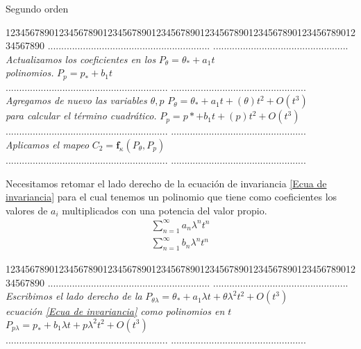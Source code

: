 \begin{center}
Segundo orden
\begin{tabbing}
12\=34567890123456789012345678901234567890123456\=7890123456789012345678901234567890\kill%
\>............................................................  \>..................................................\\
\> \textsl{Actualizamos los coeficientes en los} \> $P_{\theta}=\theta_{*}+a_{1}t$\\
\>\textsl{polinomios.} \> $P_{p}=p_{*}+b_{1}t$\\
\>............................................................  \>..................................................\\
\> \textsl{Agregamos de nuevo las variables $\theta,p$} \> $P_{\theta}=\theta_{*}+a_{1}t+(\theta)t^{2}+O(t^{3})$ \\
\> \textsl{para calcular el término cuadrático.} \> $P_{p}=p{*}+b_{1}t+(p)t^{2}+O(t^{3})$\\
\>............................................................  \>..................................................\\
\>\textsl{Aplicamos el mapeo} \> $C_{2}=\mathbf{f}_{\kappa}(P_{\theta},P_{p})$\\
\>............................................................  \>..................................................\\
\end{tabbing}
\end{center}
Necesitamos retomar el lado derecho de la ecuación de invariancia \ref{Ecua de invariancia} para el cual tenemos un polinomio que tiene como coeficientes los valores de $a_{i}$ multiplicados  con una potencia del valor propio.
\begin{eqnarray}
\sum_{n=1}^{\infty}a_{n}\lambda^{n}t^{n}\\
\sum_{n=1}^{\infty}b_{n}\lambda^{n}t^{n}
\end{eqnarray}
\begin{center}


\begin{tabbing}
12\=34567890123456789012345678901234567890123456\=7890123456789012345678901234567890\kill%
\>............................................................  \>..................................................\\
\>\textsl{Escribimos el lado derecho de la} \> $P_{\theta\lambda} = \theta_{*}+a_{1}\lambda t +\theta\lambda^{2}t^{2}+O(t^{3}) $\\
\>\textsl{ecuación \ref{Ecua de invariancia} como polinomios en $t$ }\>$ P_{p\lambda} = p_{*}+b_{1}\lambda t +p\lambda^{2}t^{2}+O(t^{3}) $\\ 
\>............................................................  \>..................................................\\
\end{tabbing}
\end{center}

